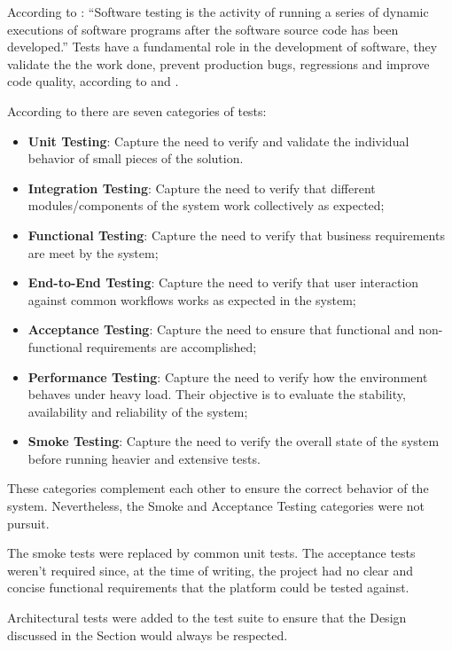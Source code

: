 According to \cite{booktest}: ``Software testing is the activity of running a series of dynamic executions of software programs after the software source code has been developed.''
Tests have a fundamental role in the development of software, they validate the the work done, prevent production bugs, regressions and improve code quality, according to \cite{linuxtest} and \cite{imbtest}.

According to \cite{typetest} there are seven categories of tests:

\begin{itemize}
    \item \textbf{Unit Testing}: Capture the need to verify and validate the individual behavior of small pieces of the solution.
    \item \textbf{Integration Testing}: Capture the need to verify that different modules/components of the system work collectively as expected;
    \item \textbf{Functional Testing}: Capture the need to verify that business requirements are meet by the system;
    \item \textbf{End-to-End Testing}: Capture the need to verify that user interaction against common workflows works as expected in the system;
    \item \textbf{Acceptance Testing}: Capture the need to ensure that functional and non-functional requirements are accomplished;
    \item \textbf{Performance Testing}: Capture the need to verify how the environment behaves under heavy load. Their objective is to evaluate the stability, availability and reliability of the system;   
    \item \textbf{Smoke Testing}: Capture the need to verify the overall state of the system before running heavier and extensive tests.
\end{itemize}

These categories complement each other to ensure the correct behavior of the system. Nevertheless, the Smoke and Acceptance Testing categories were not pursuit.

The smoke tests were replaced by common unit tests. The acceptance tests weren't required since, at the time of writing, the project had no clear and concise functional requirements that the platform could be tested against.

Architectural tests were added to the test suite to ensure that the Design discussed in the  Section would always be respected.

